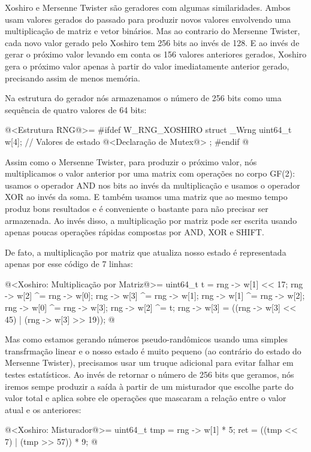 
Xoshiro e Mersenne Twister são geradores com algumas
similaridades. Ambos usam valores gerados do passado para produzir
novos valores envolvendo uma multiplicação de matriz e vetor
binários. Mas ao contrario do Mersenne Twister, cada novo valor gerado
pelo Xoshiro tem 256 bits ao invés de 128. E ao invés de gerar o
próximo valor levando em conta os 156 valores anteriores gerados,
Xoshiro gera o próximo valor apenas à partir do valor imediatamente
anterior gerado, precisando assim de menos memória.

Na estrutura do gerador nós armazenamos o número de 256 bits como uma
sequência de quatro valores de 64 bits:

\iniciocodigo
@<Estrutura RNG@>=
#ifdef W_RNG_XOSHIRO
struct _Wrng{
  uint64_t w[4];   // Valores de estado
  @<Declaração de Mutex@>
};
#endif
@
\fimcodigo

Assim como o Mersenne Twister, para produzir o próximo valor, nós
multiplicamos o valor anterior por uma matrix com operações no corpo
GF(2): usamos o operador AND nos bits ao invés da multiplicação e
usamos o operador XOR ao invés da soma. E também usamos uma matriz que
ao mesmo tempo produz bons resultados e é conveniente o bastante para
não precisar ser armazenada. Ao invés disso, a multiplicação por
matriz pode ser escrita usando apenas poucas operações rápidas
compostas por AND, XOR e SHIFT.

De fato, a multiplicação por matriz que atualiza nosso estado é
representada apenas por esse código de 7 linhas:

\iniciocodigo
@<Xoshiro: Multiplicação por Matriz@>=
{
  uint64_t t = rng -> w[1] << 17;
  rng -> w[2] ^= rng -> w[0];
  rng -> w[3] ^= rng -> w[1];
  rng -> w[1] ^= rng -> w[2];
  rng -> w[0] ^= rng -> w[3];
  rng -> w[2] ^= t;
  rng -> w[3] = ((rng -> w[3] << 45) | (rng -> w[3] >> 19));
}
@
\fimcodigo

Mas como estamos gerando números pseudo-randômicos usando uma simples
transfrmação linear e o nosso estado é muito pequeno (ao contrário do
estado do Mersenne Twister), precisamos usar um truque adicional para
evitar falhar em testes estatísticos. Ao invés de retornar o número de
256 bits que geramos, nós iremos sempe produzir a saída à partir de um
misturador que escolhe parte do valor total e aplica sobre ele
operações que mascaram a relação entre o valor atual e os anteriores:

\iniciocodigo
@<Xoshiro: Misturador@>=
{
  uint64_t tmp = rng -> w[1] * 5;
  ret = ((tmp << 7) | (tmp >> 57)) * 9;
} 
@
\fimcodigo

